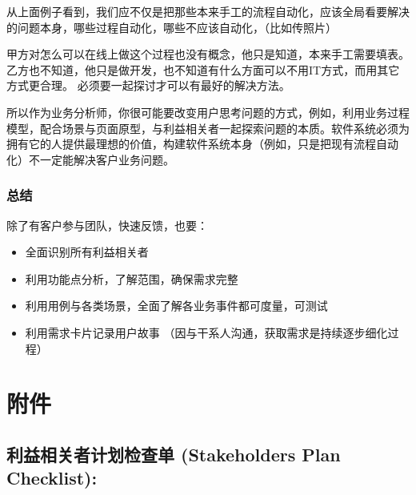 从上面例子看到，我们应不仅是把那些本来手工的流程自动化，应该全局看要解决的问题本身，哪些过程自动化，哪些不应该自动化，（比如传照片）

甲方对怎么可以在线上做这个过程也没有概念，他只是知道，本来手工需要填表。
乙方也不知道，他只是做开发，也不知道有什么方面可以不用IT方式，而用其它方式更合理。
必须要一起探讨才可以有最好的解决方法。

所以作为业务分析师，你很可能要改变用户思考问题的方式，例如，利用业务过程模型，配合场景与页面原型，与利益相关者一起探索问题的本质。软件系统必须为拥有它的人提供最理想的价值，构建软件系统本身（例如，只是把现有流程自动化）不一定能解决客户业务问题。

\hypertarget{ux603bux7ed3}{%
\subsubsection{总结}\label{ux603bux7ed3}}

除了有客户参与团队，快速反馈，也要：

\begin{itemize}
\tightlist
\item
  全面识别所有利益相关者
\item
  利用功能点分析，了解范围，确保需求完整
\item
  利用用例与各类场景，全面了解各业务事件都可度量，可测试
\item
  利用需求卡片记录用户故事
  （因与干系人沟通，获取需求是持续逐步细化过程）
\end{itemize}

\hypertarget{ux9644ux4ef6}{%
\section{附件}\label{ux9644ux4ef6}}

\hypertarget{ux5229ux76caux76f8ux5173ux8005ux8ba1ux5212ux68c0ux67e5ux5355-stakeholders-plan-checklist}{%
\subsection{利益相关者计划检查单 (Stakeholders Plan
Checklist):}\label{ux5229ux76caux76f8ux5173ux8005ux8ba1ux5212ux68c0ux67e5ux5355-stakeholders-plan-checklist}}

